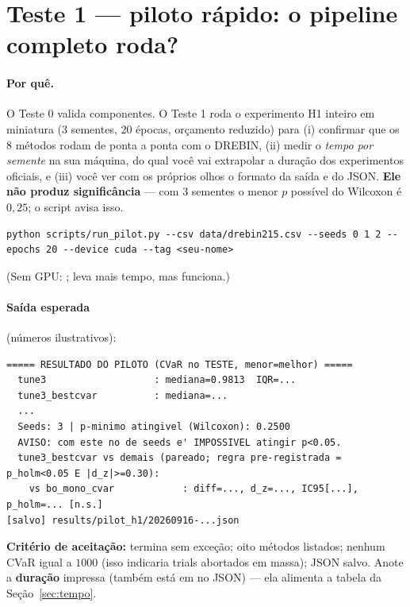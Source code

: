 \section{Teste 1 --- piloto rápido: o pipeline completo roda?}\label{sec:t1}

\paragraph{Por quê.} O Teste 0 valida componentes. O Teste 1 roda o experimento H1 inteiro em miniatura (3 sementes, 20 épocas, orçamento reduzido) para (i) confirmar que os 8 métodos rodam de ponta a ponta com o DREBIN, (ii) medir o \emph{tempo por semente} na sua máquina, do qual você vai extrapolar a duração dos experimentos oficiais, e (iii) você ver com os próprios olhos o formato da saída e do JSON. \textbf{Ele não produz significância} --- com 3 sementes o menor $p$ possível do Wilcoxon é $0{,}25$; o script avisa isso.

\begin{lstlisting}
python scripts/run_pilot.py --csv data/drebin215.csv --seeds 0 1 2 --epochs 20 --device cuda --tag <seu-nome>
\end{lstlisting}
(Sem GPU: ; leva mais tempo, mas funciona.)

\paragraph{Saída esperada} (números ilustrativos):
\begin{lstlisting}
===== RESULTADO DO PILOTO (CVaR no TESTE, menor=melhor) =====
  tune3                   : mediana=0.9813  IQR=...
  tune3_bestcvar          : mediana=...
  ...
  Seeds: 3 | p-minimo atingivel (Wilcoxon): 0.2500
  AVISO: com este no de seeds e' IMPOSSIVEL atingir p<0.05.
  tune3_bestcvar vs demais (pareado; regra pre-registrada = p_holm<0.05 E |d_z|>=0.30):
    vs bo_mono_cvar            : diff=..., d_z=..., IC95[...], p_holm=... [n.s.]
[salvo] results/pilot_h1/20260916-...json
\end{lstlisting}

\textbf{Critério de aceitação:} termina sem exceção; oito métodos listados; nenhum CVaR igual a $1000$ (isso indicaria trials abortados em massa); JSON salvo. Anote a \textbf{duração} impressa (também está em  no JSON) --- ela alimenta a tabela da Seção~\ref{sec:tempo}.


